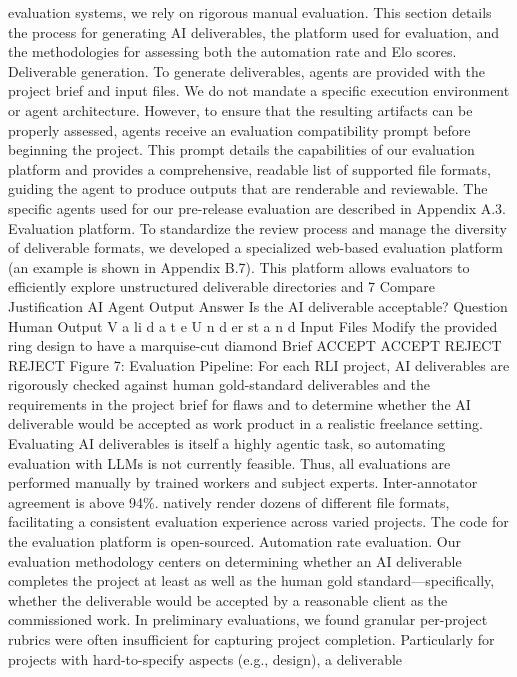 evaluation systems, we rely on rigorous manual evaluation. This section details the process for
generating AI deliverables, the platform used for evaluation, and the methodologies for assessing
both the automation rate and Elo scores.
Deliverable generation.
To generate deliverables, agents are provided with the project brief and
input files. We do not mandate a specific execution environment or agent architecture. However, to
ensure that the resulting artifacts can be properly assessed, agents receive an evaluation compatibility
prompt before beginning the project. This prompt details the capabilities of our evaluation platform
and provides a comprehensive, readable list of supported file formats, guiding the agent to produce
outputs that are renderable and reviewable. The specific agents used for our pre-release evaluation
are described in Appendix A.3.
Evaluation platform.
To standardize the review process and manage the diversity of deliverable
formats, we developed a specialized web-based evaluation platform (an example is shown in Appendix
B.7). This platform allows evaluators to efficiently explore unstructured deliverable directories and
7
Compare
Justification
AI Agent Output
Answer
Is the AI deliverable
acceptable?
Question
Human Output
V
a
li
d
a
t
e
U
n
d
er
st
a
n
d
Input Files
Modify the provided
ring design to have
a marquise-cut
diamond
Brief
ACCEPT
ACCEPT
REJECT
REJECT
Figure 7: Evaluation Pipeline: For each RLI project, AI deliverables are rigorously checked against
human gold-standard deliverables and the requirements in the project brief for flaws and to determine
whether the AI deliverable would be accepted as work product in a realistic freelance setting.
Evaluating AI deliverables is itself a highly agentic task, so automating evaluation with LLMs is
not currently feasible. Thus, all evaluations are performed manually by trained workers and subject
experts. Inter-annotator agreement is above 94\%.
natively render dozens of different file formats, facilitating a consistent evaluation experience across
varied projects. The code for the evaluation platform is open-sourced.
Automation rate evaluation.
Our evaluation methodology centers on determining whether an AI
deliverable completes the project at least as well as the human gold standard—specifically, whether
the deliverable would be accepted by a reasonable client as the commissioned work.
In preliminary evaluations, we found granular per-project rubrics were often insufficient for capturing
project completion. Particularly for projects with hard-to-specify aspects (e.g., design), a deliverable
